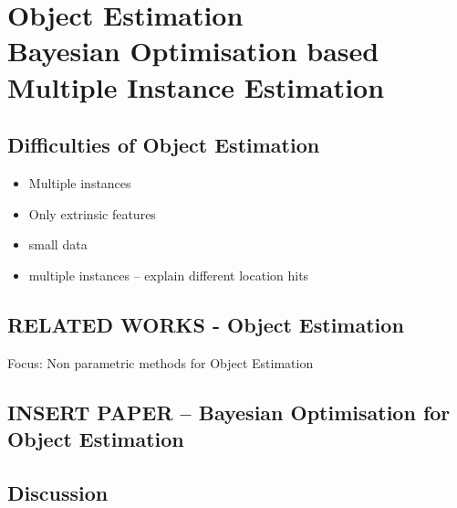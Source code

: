 \chapter{Object Estimation \\ {\Large Bayesian Optimisation based Multiple Instance Estimation}}
\label{chap:objEstimation}

\section{Difficulties of Object Estimation}
\begin{itemize}
\item Multiple instances
\item Only extrinsic features
\item small data
\item multiple instances -- explain different location hits
\end{itemize}
\section{RELATED WORKS - Object Estimation}
Focus: Non parametric methods for Object Estimation
\section{INSERT PAPER -- Bayesian Optimisation for Object Estimation}
\section{Discussion}

